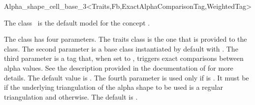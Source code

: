 \begin{ccRefClass}{Alpha_shape_cell_base_3<Traits,Fb,ExactAlphaComparisonTag,WeightedTag>}

\ccDefinition

The class \ccRefName\ is the default  model for the concept
.

The class has four parameters. The traits class  is the one that is provided
to the  class.
The second parameter  is a base class instantiated by default
with .
The third parameter  is a tag that, when set to
, triggers exact comparisons between alpha values. See the description
provided in the documentation of  for more details. The default value is .
The fourth parameter  is used only if  is . It 
must be  if the underlying triangulation of the alpha shape to be used is a regular triangulation
and  otherwise. The default is .




\ccIsModel
{}

\ccInheritsFrom



\end{ccRefClass}
